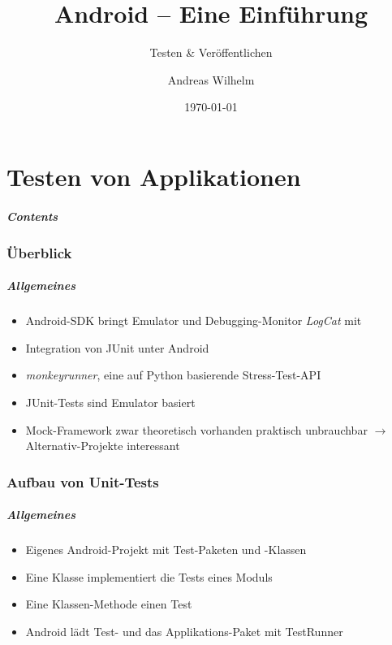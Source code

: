 \title{Android -- Eine Einführung}
\subtitle{Testen \& Veröffentlichen}
\author[A. Wilhelm]{Andreas Wilhelm}
\titlegraphic{}
\date{\today}

\begin{frame}[plain]
  \titlepage
\end{frame}

\part{Testen von Applikationen}
\frame{\partpage}
\begin{frame}
	\frametitle{Contents}
	\tableofcontents[]
\end{frame}

\section{Überblick}
\begin{frame}
	\frametitle{Allgemeines}
	\begin{itemize}
		\item Android-SDK bringt Emulator und Debugging-Monitor \emph{LogCat} 
			mit
		\item Integration von JUnit unter Android
		\item \emph{monkeyrunner}, eine auf Python basierende Stress-Test-API
		\item JUnit-Tests sind Emulator basiert
		\item Mock-Framework zwar theoretisch vorhanden praktisch unbrauchbar
			$\rightarrow$ Alternativ-Projekte interessant
	\end{itemize}
\end{frame}

\section{Aufbau von Unit-Tests}
\begin{frame}
	\frametitle{Allgemeines}
	\begin{itemize}
		\item Eigenes Android-Projekt mit Test-Paketen und -Klassen
		\item Eine Klasse implementiert die Tests eines Moduls
		\item Eine Klassen-Methode einen Test
		\item Android lädt Test- und das Applikations-Paket mit TestRunner
	\end{itemize}
\end{frame}

